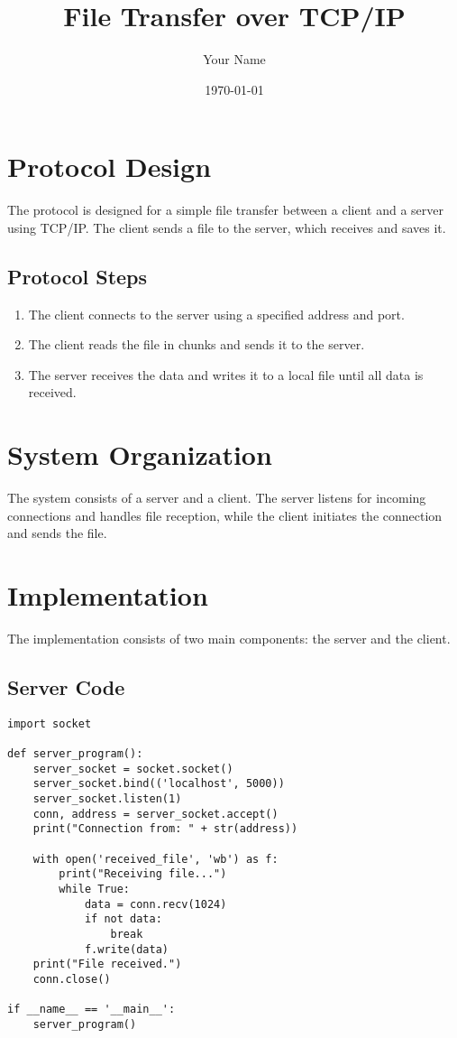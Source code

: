 \documentclass{article}
\title{File Transfer over TCP/IP}
\author{Your Name}
\date{\today}
\begin{document}
\maketitle

\section{Protocol Design}
The protocol is designed for a simple file transfer between a client and a server using TCP/IP. The client sends a file to the server, which receives and saves it. 

\subsection{Protocol Steps}
\begin{enumerate}
    \item The client connects to the server using a specified address and port.
    \item The client reads the file in chunks and sends it to the server.
    \item The server receives the data and writes it to a local file until all data is received.
\end{enumerate}

\section{System Organization}
The system consists of a server and a client. The server listens for incoming connections and handles file reception, while the client initiates the connection and sends the file.

\section{Implementation}
The implementation consists of two main components: the server and the client.

\subsection{Server Code}
\begin{verbatim}
import socket

def server_program():
    server_socket = socket.socket()
    server_socket.bind(('localhost', 5000))
    server_socket.listen(1)
    conn, address = server_socket.accept()
    print("Connection from: " + str(address))

    with open('received_file', 'wb') as f:
        print("Receiving file...")
        while True:
            data = conn.recv(1024)
            if not data:
                break
            f.write(data)
    print("File received.")
    conn.close()

if __name__ == '__main__':
    server_program()
\end{verbatim}
\end{document}
